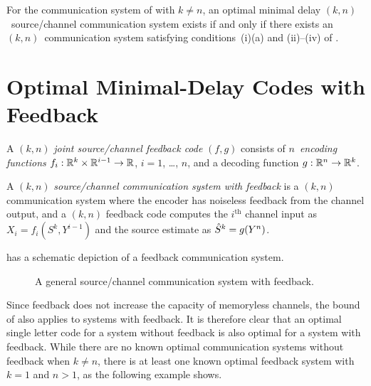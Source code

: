 \begin{lemma}
  \label{lem:optcodenkexist}
  For the communication system of  with $k \ne n$, an
  optimal minimal delay $(k,n)$~source/channel communication system exists if
  and only if there exists an $(k,n)$~communication system satisfying
  conditions~(i)(a) and (ii)--(iv) of .
\end{lemma}


\section{Optimal Minimal-Delay Codes with Feedback}
\label{sec:optmindelfb}

\begin{definition}
  \label{def:fbcode}
  A $(k,n)$ \emph{joint source/channel feedback code} $(f,g)$ consists of
  $n$~\emph{encoding functions} $f_i : \mathbb{R}^k \times \mathbb{R}^{i-1} \rightarrow \mathbb{R}$, $i = 1$,
  \dots, $n$, and a decoding function $g: \mathbb{R}^n \rightarrow \mathbb{R}^k$. 
\end{definition}

\begin{definition}
  \label{def:fbcommsys}
  A $(k,n)$ \emph{source/channel communication system with feedback} is a
  $(k,n)$ communication system where the encoder has noiseless feedback from the
  channel output, and a $(k,n)$ feedback code computes the $i^{\text{th}}$
  channel input as $X_i = f_i(S^k, Y^{i-1})$ and the source estimate as ${\hat{S}}^k =
  g(Y^n)$. 
\end{definition}

 has a schematic depiction of a feedback communication system.
\begin{figure}[tbp]
  \begin{center}
    
  \end{center}
  \caption{A general source/channel communication system with feedback.}
  \label{fig:fbcommsys}
\end{figure}

Since feedback does not increase the capacity of memoryless channels, the bound
of  also applies to systems with feedback. It is therefore
clear that an optimal single letter code for a system without feedback is also
optimal for a system with feedback. While there are no known optimal
communication systems without feedback when $k \ne n$, there is at least one
known optimal feedback system with $k = 1$ and $n > 1$, as the following example
shows.

